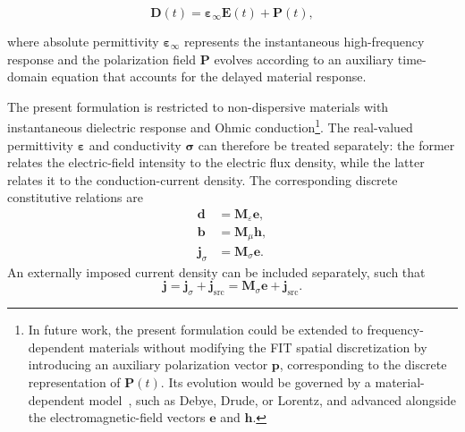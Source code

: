 \begin{equation}
\mathbf{D}(t)
=
\boldsymbol{\varepsilon}_{\infty}\mathbf{E}(t)
+
\mathbf{P}(t),
\label{eq:polarization_material_model}
\end{equation}

where absolute permittivity $\boldsymbol{\varepsilon}_{\infty}$ represents the instantaneous high-frequency response and the polarization field $\mathbf{P}$ evolves according to an auxiliary time-domain equation that accounts for the delayed material response.

The present formulation is restricted to non-dispersive materials with instantaneous dielectric response and Ohmic conduction\footnote{In future work, the present formulation could be extended to frequency-dependent materials without modifying the FIT spatial discretization by introducing an auxiliary polarization vector $\mathbf{p}$, corresponding to the discrete representation of $\mathbf{P}(t)$. Its evolution would be governed by a material-dependent model~\cite{hulseDispersiveModelsFinitedifference1994}, such as Debye, Drude, or Lorentz, and advanced alongside the electromagnetic-field vectors $\mathbf{e}$ and $\mathbf{h}$.}. The real-valued permittivity $\boldsymbol{\varepsilon}$ and conductivity $\boldsymbol{\sigma}$ can therefore be treated separately: the former relates the electric-field intensity to the electric flux density, while the latter relates it to the conduction-current density. The corresponding discrete constitutive relations are
%
\begin{equation}
\begin{aligned}
\mathbf{d}
&=
\mathbf{M}_{\varepsilon}\mathbf{e},
\\
\mathbf{b}
&=
\mathbf{M}_{\mu}\mathbf{h},
\\
\mathbf{j}_{\sigma}
&=
\mathbf{M}_{\sigma}\mathbf{e}.
\end{aligned}
\label{eq:discrete_constitutive_relations}
\end{equation}
%
An externally imposed current density can be included separately, such that
%
\begin{equation}
\mathbf{j}
=
\mathbf{j}_{\sigma}
+
\mathbf{j}_{\mathrm{src}}
=
\mathbf{M}_{\sigma}\mathbf{e}
+
\mathbf{j}_{\mathrm{src}}.
\label{eq:total_current_density}
\end{equation}
%
